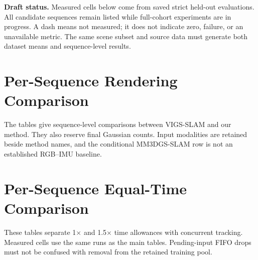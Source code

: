 \clearpage
\renewcommand{\thepage}{S\arabic{page}}
\setcounter{page}{1}
\appendix

\noindent\textbf{Draft status.}
Measured cells below come from saved strict held-out evaluations. All candidate sequences remain listed while full-cohort experiments are in progress. A dash means
not measured; it does not indicate zero, failure, or an unavailable metric.
The same scene subset and source data must generate both dataset means and
sequence-level results.

\section{Per-Sequence Rendering Comparison}
\label{app:rendering}
The tables give sequence-level comparisons between VIGS-SLAM and our method. They also reserve final Gaussian
counts. Input modalities are retained beside method names, and the conditional
MM3DGS-SLAM row is not an established RGB--IMU baseline.


\clearpage

\section{Per-Sequence Equal-Time Comparison}
\label{app:time}
These tables separate 1$\times$ and 1.5$\times$ time allowances with concurrent
tracking. Measured cells use the same runs as the main tables.
Pending-input FIFO drops must not be confused with removal from the retained
training pool.


\clearpage
